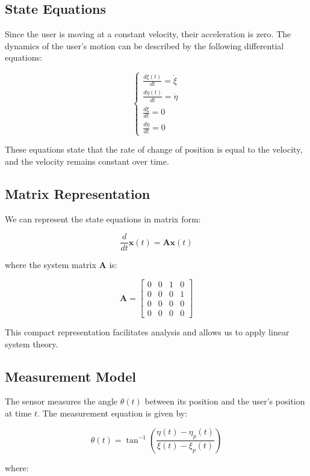 \documentclass[12pt]{article}
\begin{document}
\subsection{State Equations}

Since the user is moving at a constant velocity, their acceleration is zero. The dynamics of the user's motion can be described by the following differential equations:

\[
\begin{cases}
\frac{d\xi(t)}{dt} = \dot{\xi} \\
\frac{d\eta(t)}{dt} = \dot{\eta} \\
\frac{d\dot{\xi}}{dt} = 0 \\
\frac{d\dot{\eta}}{dt} = 0
\end{cases}
\]

These equations state that the rate of change of position is equal to the velocity, and the velocity remains constant over time.

\subsection{Matrix Representation}

We can represent the state equations in matrix form:

\[
\frac{d}{dt} \mathbf{x}(t) = \mathbf{A} \mathbf{x}(t)
\]

where the system matrix \( \mathbf{A} \) is:

\[
\mathbf{A} = \begin{bmatrix}
0 & 0 & 1 & 0 \\
0 & 0 & 0 & 1 \\
0 & 0 & 0 & 0 \\
0 & 0 & 0 & 0
\end{bmatrix}
\]

This compact representation facilitates analysis and allows us to apply linear system theory.

\subsection{Measurement Model}

The sensor measures the angle \( \theta(t) \) between its position and the user's position at time \( t \). The measurement equation is given by:

\[
\theta(t) = \tan^{-1} \left( \frac{\eta(t) - \eta_p(t)}{\xi(t) - \xi_p(t)} \right)
\]

where:
\end{document}
